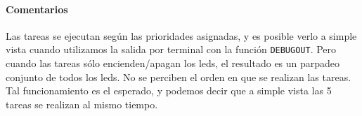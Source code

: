 \paragraph{Comentarios}
Las tareas se ejecutan según las prioridades asignadas, y es posible verlo a simple vista cuando utilizamos la salida por terminal con la función \verb|DEBUGOUT|. Pero cuando las tareas sólo encienden/apagan los leds, el resultado es un parpadeo conjunto de todos los leds. No se perciben el orden en que se realizan las tareas. Tal funcionamiento es el esperado, y podemos decir que a simple vista las 5 tareas se realizan al mismo tiempo.


